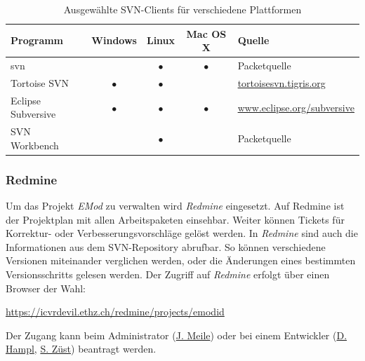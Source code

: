 \documentclass[a4paper,11pt,pdftex,twoside]{scrartcl}
\makeatletter
\newcommand{\iwfadmin}{Administrator (\href{mailto:meile@iwf.mavt.ethz.ch}{J. Meile})\xspace}
\newcommand{\developper}{Entwickler (\href{mailto:hampl@iwf.mavt.ethz.ch}{D. Hampl}, \href{mailto:sizuest@inspire.ethz.ch}{S. Züst})\xspace}
\makeatother
\begin{document}
\begin{table}[h]
	\centering
	\caption{Ausgewählte SVN-Clients für verschiedene Plattformen}\label{tab:svnclients}
	\begin{tabular}{lcccl}
		\textbf{Programm}		& \textbf{Windows}	& \textbf{Linux}	& \textbf{Mac OS X}	& \textbf{Quelle}\\
		\hline
		svn                 &   & $\bullet$ & $\bullet$ & Packetquelle\\
		Tortoise SVN        & $\bullet$ &  $\bullet$ &   & \href{http://tortoisesvn.tigris.org/}{tortoisesvn.tigris.org}\\
		Eclipse Subversive  & $\bullet$ & $\bullet$ & $\bullet$ & \href{http://www.eclipse.org/subversive/}{www.eclipse.org/subversive}\\
		SVN Workbench       &   & $\bullet$ &   & Packetquelle
	\end{tabular}
\end{table}

\subsubsection{Redmine}
%

Um das Projekt \emph{EMod} zu verwalten wird \emph{Redmine} eingesetzt. 
Auf Redmine ist der Projektplan mit allen Arbeitspaketen einsehbar.
Weiter können Tickets für Korrektur- oder Verbesserungsvorschläge gelöst werden.
In \emph{Redmine} sind auch die Informationen aus dem SVN-Repository abrufbar.
So können verschiedene Versionen miteinander verglichen werden, oder die Änderungen eines bestimmten Versionsschritts gelesen werden.
Der Zugriff auf \emph{Redmine} erfolgt über einen Browser der Wahl:

\begin{center}
	\href{https://icvrdevil.ethz.ch/redmine/projects/emodid}{https://icvrdevil.ethz.ch/redmine/projects/emodid}
\end{center}
Der Zugang kann beim \iwfadmin oder bei einem \developper beantragt werden.

\end{document}
